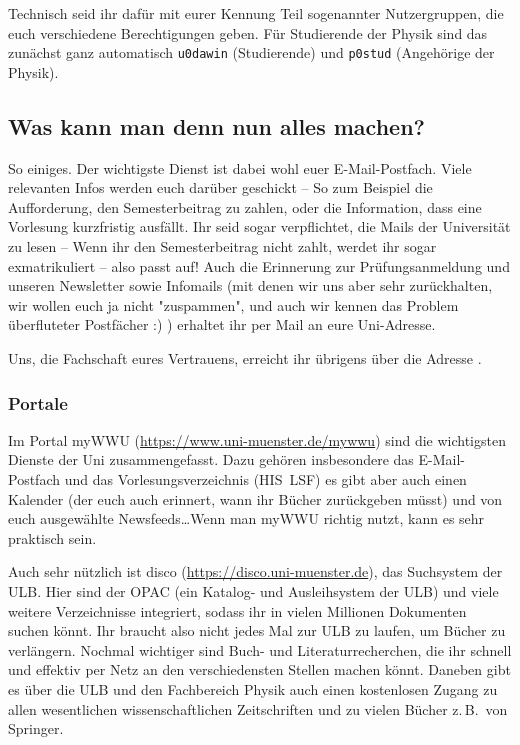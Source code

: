 \begin{multicols}{2}
Technisch seid ihr dafür mit eurer Kennung Teil sogenannter Nutzergruppen, die euch verschiedene Berechtigungen geben. Für Studierende der Physik sind das zunächst ganz automatisch \texttt{u0dawin} (Studierende) und \texttt{p0stud} (Angehörige der Physik).

\subsection{Was kann man denn nun alles machen?}
So einiges. Der wichtigste Dienst ist dabei wohl euer E-Mail-Postfach.
Viele relevanten Infos werden euch darüber geschickt -- So zum Beispiel die Aufforderung, den Semesterbeitrag zu zahlen, oder die Information, dass eine Vorlesung kurzfristig ausfällt.
Ihr seid sogar verpflichtet, die Mails der Universität zu lesen -- Wenn ihr den Semesterbeitrag nicht zahlt, werdet ihr sogar exmatrikuliert -- also passt auf! 
Auch die Erinnerung zur Prüfungsanmeldung und unseren Newsletter sowie Infomails (mit denen wir uns aber sehr zurückhalten, wir wollen euch ja nicht "zuspammen", und auch wir kennen das Problem überfluteter Postfächer :) ) erhaltet ihr per Mail an eure Uni-Adresse.

Uns, die Fachschaft eures Vertrauens, erreicht ihr übrigens über die Adresse .

\subsubsection{Portale}
Im Portal myWWU (\url{https://www.uni-muenster.de/mywwu}) sind die wichtigsten Dienste der Uni zusammengefasst.
Dazu gehören insbesondere das E-Mail-Postfach und das Vorlesungsverzeichnis (HIS~LSF) es gibt aber auch einen Kalender (der euch auch erinnert, wann ihr Bücher zurückgeben müsst) und von euch ausgewählte Newsfeeds\dots Wenn man myWWU richtig nutzt, kann es sehr praktisch sein.

Auch sehr nützlich ist disco (\url{https://disco.uni-muenster.de}), das Suchsystem der ULB.
Hier sind der OPAC (ein Katalog- und Ausleihsystem der ULB) und viele weitere Verzeichnisse integriert, sodass ihr in vielen Millionen Dokumenten suchen könnt.
Ihr braucht also nicht jedes Mal zur ULB zu laufen, um Bücher zu verlängern.
Nochmal wichtiger sind Buch- und Literaturrecherchen, die ihr schnell und effektiv per Netz an den verschiedensten Stellen machen könnt.
Daneben gibt es über die ULB und den Fachbereich Physik auch einen kostenlosen Zugang zu allen wesentlichen wissenschaftlichen Zeitschriften und zu vielen Bücher z.\,B.\ von Springer.


\end{multicols}
